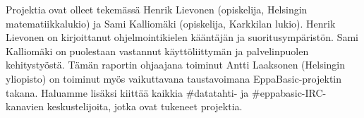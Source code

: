 Projektia ovat olleet tekemässä Henrik Lievonen
(opiskelija, Helsingin matematiikkalukio) ja Sami Kalliomäki
(opiskelija, Karkkilan lukio). Henrik Lievonen
on kirjoittanut ohjelmointikielen kääntäjän ja
suoritusympäristön. Sami Kalliomäki on puolestaan
vastannut käyttöliittymän ja palvelinpuolen kehitystyöstä.
Tämän raportin ohjaajana toiminut
Antti Laaksonen (Helsingin yliopisto)
on toiminut myös vaikuttavana
taustavoimana EppaBasic-projektin takana.
Haluamme lisäksi kiittää kaikkia
\#datatahti- ja
\#eppabasic-IRC-kanavien keskustelijoita,
jotka ovat tukeneet projektia.
